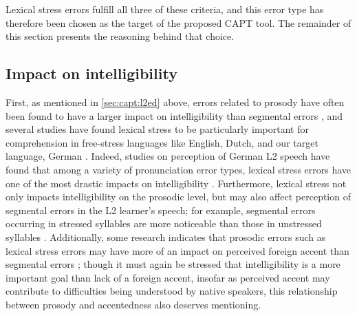 	Lexical stress errors 
	fulfill all three of these criteria, and this error type has therefore been chosen as the target of the proposed CAPT tool. The remainder of this section 
	presents the reasoning behind 
	that choice. 
%	
%	
%
%	 

%
%	
%
		\subsection{Impact on intelligibility}
		\label{sec:targeting:intelligibility}

	First, as mentioned in \cref{sec:capt:l2ed} above, errors related to prosody have 
	often
	 been found to have a larger impact on intelligibility than segmental errors \citep{Derwing2005,Witt2012}, and several studies have found lexical stress to be particularly important for comprehension in free-stress languages like English, Dutch, and our target language, German \citep{Hirschfeld1994,Hahn2004,Cutler2005}.
	Indeed, studies on perception of German L2 speech have found that among a variety of pronunciation error types, lexical stress errors have one of the most drastic impacts on intelligibility \citep{Hirschfeld1994}.
%
		Furthermore, lexical stress not only impacts intelligibility on the prosodic level, but may also affect perception of segmental errors in the L2 learner's speech; for example, segmental errors occurring in stressed syllables are more noticeable than those in unstressed syllables \citep{Cutler2005,Michaux2012}. 
		Additionally, some research indicates that prosodic errors such as lexical stress errors may have more of an impact on perceived foreign accent than segmental errors \citep{Witt2012}; though it must again be stressed that intelligibility is a more important goal than lack of a foreign accent, insofar as perceived accent may contribute to difficulties being understood by native speakers, this relationship between prosody and accentedness also deserves mentioning.


